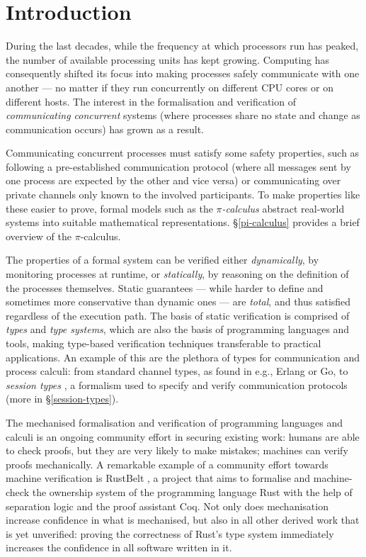 \documentclass{mproj}
\newcommand{\picalc}{$\pi$-calculus}
\begin{document}
\chapter{Introduction}\label{intro}

During the last decades, while the frequency at which processors run has peaked, the number of available processing units has kept growing. Computing has consequently shifted its focus into making processes safely communicate with one another --- no matter if they run concurrently on different CPU cores or on different hosts. The interest in the formalisation and verification of \emph{communicating concurrent} systems (where processes share no state and change as communication occurs) has grown as a result.

Communicating concurrent processes must satisfy some safety properties, such as following a pre-established communication protocol (where all messages sent by one process are expected by the other and vice versa) or communicating over private channels only known to the involved participants. To make properties like these easier to prove, formal models such as the \emph{\picalc{}} \cite{Walker1989,Milner1989,Milner1991,Sangiorgi2001} abstract real-world systems into suitable mathematical representations. \S \ref{pi-calculus} provides a brief overview of the \picalc.

The properties of a formal system can be verified either \emph{dynamically}, by monitoring processes at runtime, or \emph{statically}, by reasoning on the definition of the processes themselves.  Static guarantees --- while harder to define and sometimes more conservative than dynamic ones --- are \emph{total}, and thus satisfied regardless of the execution path. The basis of static verification is comprised of \emph{types} and \emph{type systems}, which are also the basis of programming languages and tools, making type-based verification techniques transferable to practical applications. An example of this are the plethora of types for communication and process calculi: from standard channel types, as found in e.g., Erlang or Go, to \emph{session types} \cite{Honda1993, Takeuchi1994, Honda1998}, a formalism used to specify and verify communication protocols (more in \S \ref{session-types}).


The mechanised formalisation and verification of programming languages and calculi is an ongoing community effort in securing existing work: humans are able to check proofs, but they are very likely to make mistakes; machines can verify proofs mechanically. A remarkable example of a community effort towards machine verification is RustBelt \cite{Dreyer2018}, a project that aims to formalise and machine-check the ownership system of the programming language Rust with the help of separation logic \cite{} and the proof assistant Coq. Not only does mechanisation increase confidence in what is mechanised, but also in all other derived work that is yet unverified: proving the correctness of Rust's type system immediately increases the confidence in all software written in it.
\end{document}
